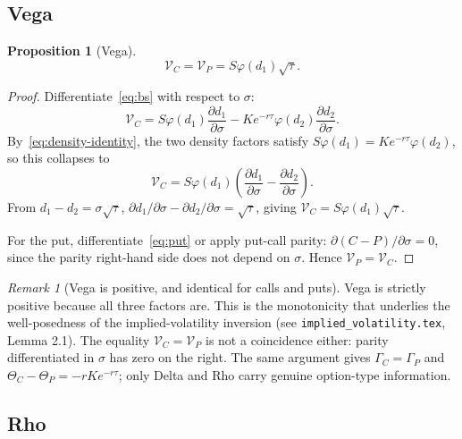 \documentclass[11pt,a4paper]{article}
\theoremstyle{plain}
\newtheorem{proposition}[theorem]{Proposition}
\theoremstyle{definition}
\theoremstyle{remark}
\newtheorem{remark}[theorem]{Remark}
\newcommand{\Vega}{\mathcal{V}}
\begin{document}
\subsection{Vega}

\begin{proposition}[Vega]
\label{prop:vega}
\[
    \Vega_C = \Vega_P = S \varphi(d_1) \sqrt{\tau}.
\]
\end{proposition}

\begin{proof}
Differentiate~\eqref{eq:bs} with respect to \(\sigma\):
\[
    \Vega_C = S \varphi(d_1) \frac{\partial d_1}{\partial \sigma}
            - K e^{-r\tau} \varphi(d_2) \frac{\partial d_2}{\partial \sigma}.
\]
By~\eqref{eq:density-identity}, the two density factors satisfy
\(S\varphi(d_1) = K e^{-r\tau} \varphi(d_2)\), so this collapses to
\[
    \Vega_C = S \varphi(d_1)\!\left(
        \frac{\partial d_1}{\partial \sigma}
        - \frac{\partial d_2}{\partial \sigma}
    \right).
\]
From \(d_1 - d_2 = \sigma\sqrt{\tau}\),
\(\partial d_1/\partial\sigma - \partial d_2/\partial\sigma = \sqrt{\tau}\),
giving \(\Vega_C = S \varphi(d_1) \sqrt{\tau}\).

For the put, differentiate~\eqref{eq:put} or apply put-call parity:
\(\partial(C - P)/\partial\sigma = 0\), since the parity right-hand
side does not depend on \(\sigma\). Hence \(\Vega_P = \Vega_C\).
\end{proof}

\begin{remark}[Vega is positive, and identical for calls and puts]
Vega is strictly positive because all three factors are. This is the
monotonicity that underlies the well-posedness of the
implied-volatility inversion (see \texttt{implied\_volatility.tex},
Lemma 2.1). The equality \(\Vega_C = \Vega_P\) is not a coincidence
either: parity differentiated in \(\sigma\) has zero on the right.
The same argument gives \(\Gamma_C = \Gamma_P\) and
\(\Theta_C - \Theta_P = -r K e^{-r\tau}\); only Delta and Rho carry
genuine option-type information.
\end{remark}

\subsection{Rho}
\end{document}
